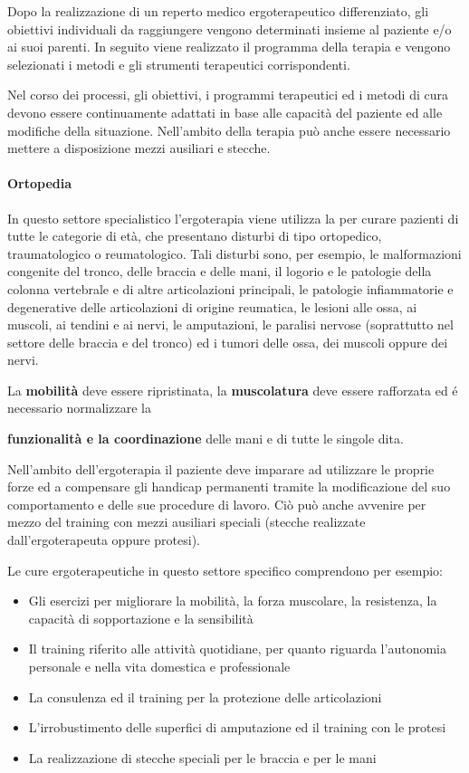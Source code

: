 Dopo la realizzazione di un reperto medico ergoterapeutico
differenziato, gli obiettivi individuali da raggiungere vengono
determinati insieme al paziente e/o ai suoi parenti. In seguito viene
realizzato il programma della terapia e vengono selezionati i metodi e
gli strumenti terapeutici corrispondenti.

Nel corso dei processi, gli obiettivi, i programmi terapeutici ed i
metodi di cura devono essere continuamente adattati in base alle
capacità del paziente ed alle modifiche della situazione. Nell'ambito
della terapia può anche essere necessario mettere a disposizione mezzi
ausiliari e stecche.

 
\paragraph{Ortopedia}

 

In questo settore specialistico l'ergoterapia viene utilizza la per
curare pazienti di tutte le categorie di età, che presentano disturbi di
tipo ortopedico, traumatologico o reumatologico. Tali disturbi sono, per
esempio, le malformazioni congenite del tronco, delle braccia e delle
mani, il logorio e le patologie della colonna vertebrale e di altre
articolazioni principali, le patologie infiammatorie e degenerative
delle articolazioni di origine reumatica, le lesioni alle ossa, ai
muscoli, ai tendini e ai nervi, le amputazioni, le paralisi nervose
(soprattutto nel settore delle braccia e del tronco) ed i tumori delle
ossa, dei muscoli oppure dei nervi.

La \textbf{mobilità} deve essere ripristinata, la \textbf{muscolatura}
deve essere rafforzata ed é necessario normalizzare la

 
\textbf{funzionalità e la coordinazione} delle mani e di tutte le
singole dita.
 

Nell'ambito dell'ergoterapia il paziente deve imparare ad utilizzare le
proprie forze ed a compensare gli handicap permanenti tramite la
modificazione del suo comportamento e delle sue procedure di lavoro. Ciò
può anche avvenire per mezzo del training con mezzi ausiliari speciali
(stecche realizzate dall'ergoterapeuta oppure protesi).

Le cure ergoterapeutiche in questo settore specifico comprendono per
esempio:

\begin{itemize}
\item
  Gli esercizi per migliorare la mobilità, la forza muscolare, la
  resistenza, la capacità di sopportazione e la sensibilità
\item
  Il training riferito alle attività quotidiane, per quanto riguarda
  l'autonomia personale e nella vita domestica e professionale
\item
  La consulenza ed il training per la protezione delle articolazioni
\item
  L'irrobustimento delle superfici di amputazione ed il training con le
  protesi
\item
  La realizzazione di stecche speciali per le braccia e per le mani
\end{itemize}

